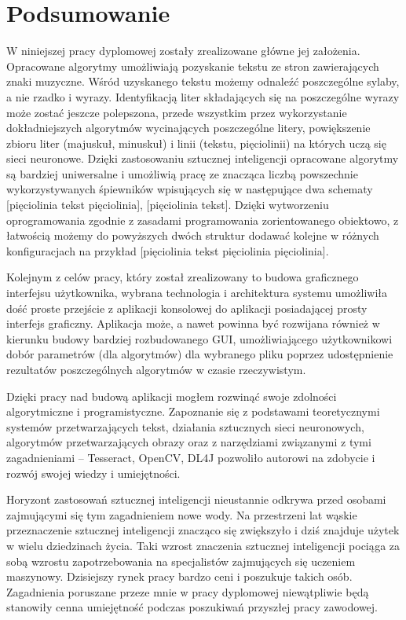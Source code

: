 \documentclass[a4paper,12pt]{article}
\newcommand\spacingIndent{2.2em}
\begin{document}
	   \section{Podsumowanie}
	   \hspace{\spacingIndent} W niniejszej pracy dyplomowej zostały zrealizowane główne jej założenia. Opracowane algorytmy umożliwiają pozyskanie tekstu ze stron zawierających znaki muzyczne. Wśród uzyskanego tekstu możemy odnaleźć poszczególne sylaby, a nie rzadko i wyrazy. Identyfikacją liter składających się na poszczególne wyrazy może zostać jeszcze polepszona, przede wszystkim przez wykorzystanie dokładniejszych algorytmów wycinających poszczególne litery, powiększenie zbioru liter (majuskuł, minuskuł) i linii (tekstu, pięciolinii) na których uczą się sieci neuronowe. Dzięki zastosowaniu sztucznej inteligencji opracowane algorytmy są bardziej uniwersalne i umożliwią pracę ze znacząca liczbą powszechnie wykorzystywanych śpiewników wpisujących się w następujące dwa schematy [pięciolinia tekst pięciolinia], [pięciolinia tekst]. Dzięki wytworzeniu oprogramowania zgodnie z zasadami programowania zorientowanego obiektowo, z łatwością możemy do powyższych dwóch struktur dodawać kolejne w różnych konfiguracjach na przykład [pięciolinia tekst pięciolinia pięciolinia].
	   
	   Kolejnym z celów pracy, który został zrealizowany to budowa graficznego interfejsu użytkownika, wybrana technologia i architektura systemu umożliwiła dość proste przejście z aplikacji konsolowej do aplikacji posiadającej prosty interfejs graficzny. Aplikacja może, a nawet powinna być rozwijana również w kierunku budowy bardziej rozbudowanego GUI, umożliwiającego użytkownikowi dobór parametrów (dla algorytmów) dla wybranego pliku poprzez udostępnienie rezultatów poszczególnych algorytmów w czasie rzeczywistym.
	   
	   Dzięki pracy nad budową aplikacji mogłem rozwinąć swoje zdolności algorytmiczne i programistyczne. Zapoznanie się z podstawami teoretycznymi systemów przetwarzających tekst, działania sztucznych sieci neuronowych, algorytmów przetwarzających obrazy oraz z narzędziami związanymi z tymi zagadnieniami -- Tesseract, OpenCV, DL4J pozwoliło autorowi na zdobycie i rozwój swojej wiedzy i umiejętności.
	   
	   Horyzont zastosowań sztucznej inteligencji nieustannie odkrywa przed osobami zajmującymi się tym zagadnieniem nowe wody. Na przestrzeni lat wąskie przeznaczenie sztucznej inteligencji znacząco się zwiększyło i dziś znajduje użytek w wielu dziedzinach życia. Taki wzrost znaczenia sztucznej inteligencji pociąga za sobą wzrostu zapotrzebowania na specjalistów zajmujących się uczeniem maszynowy. Dzisiejszy rynek pracy bardzo ceni i poszukuje takich osób. Zagadnienia poruszane przeze mnie w pracy dyplomowej niewątpliwie będą stanowiły cenna umiejętność podczas poszukiwań przyszłej pracy zawodowej. 
	   
\end{document}

